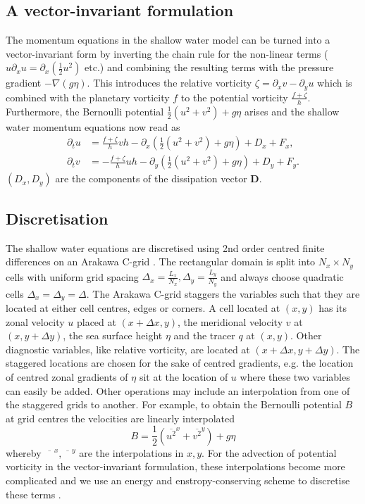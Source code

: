 \subsection{A vector-invariant formulation}
\label{sec:vector_invariant}

The momentum equations in the shallow water model can be turned into a vector-invariant form by inverting the chain rule for the non-linear terms
($u\partial_xu = \partial_x(\tfrac{1}{2}u^2)$ etc.) and combining the resulting terms with the pressure gradient $-\nabla (g\eta)$. This
introduces the relative vorticity $\zeta = \partial_xv - \partial_yu$ which is combined with the planetary vorticity $f$ to the potential
vorticity $\frac{f + \zeta}{h}$. Furthermore, the Bernoulli potential $\tfrac{1}{2}(u^2 + v^2) + g\eta$ arises and the shallow water
momentum equations now read as
\begin{subequations}
\begin{align}
\partial_tu &= \frac{f + \zeta}{h}vh -\partial_x\left(\frac{1}{2}(u^2 + v^2) + g\eta \right) + D_x + F_x, \\
\partial_tv &= -\frac{f + \zeta}{h}uh -\partial_y\left(\frac{1}{2}(u^2 + v^2) + g\eta \right) + D_y + F_y.
\end{align}
\end{subequations}
$(D_x,D_y)$ are the components of the dissipation vector $\mathbf{D}$.


\subsection{Discretisation}
The shallow water equations are discretised using 2nd order centred finite differences on an Arakawa C-grid \citep{Arakawa1977}.
The rectangular domain is split into $N_x \times N_y$ cells with uniform grid spacing
$\Delta_x = \frac{L_x}{N_x}, \Delta_y = \frac{L_y}{N_y}$ and always choose quadratic cells $\Delta_x = \Delta_y = \Delta$.
The Arakawa C-grid staggers the variables such that they are located at either cell centres, edges or corners. A cell located at
$(x,y)$ has its zonal velocity $u$ placed at $(x + \Delta x,y)$, the meridional velocity $v$ at $(x,y + \Delta y)$, the sea surface height
$\eta$ and the tracer $q$ at $(x,y)$. Other diagnostic variables, like relative vorticity, are located at $(x+\Delta x, y + \Delta y)$.
The staggered locations are chosen for the sake of centred gradients, e.g. the location of centred zonal gradients of $\eta$ sit
at the location of $u$ where these two variables can easily be added. Other operations may include an interpolation from one
of the staggered grids to another. For example, to obtain the Bernoulli potential $B$ at grid centres the velocities are linearly
interpolated
\begin{equation}
B = \frac{1}{2}(\overline{u^2}^x + \overline{v^2}^y) + g\eta
\end{equation}
whereby $\overline{\phantom{u_2}}^x, \overline{\phantom{v_2}}^y$ are the interpolations in $x,y$. For the advection of potential
vorticity in the vector-invariant formulation, these interpolations become more complicated and we use an energy and enstropy-conserving
scheme to discretise these terms \citep{Arakawa1990,Salmon2004,Salmon2007}.

